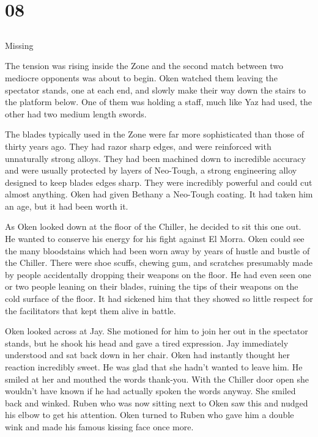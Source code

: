\chapter{08}
\section{}
Missing  

The tension was rising inside the Zone and the second match between two mediocre opponents was about to begin.  Oken watched them leaving the spectator stands, one at each end, and slowly make their way down the stairs to the platform below.  One of them was holding a staff, much like Yaz had used, the other had two medium length swords.

The blades typically used in the Zone were far more sophisticated than those of thirty years ago.  They had razor sharp edges, and were reinforced with unnaturally strong alloys.  They had been machined down to incredible accuracy and were usually protected by layers of Neo-Tough, a strong engineering alloy designed to keep blades edges sharp.  They were incredibly powerful and could cut almost anything.  Oken had given Bethany a Neo-Tough coating.  It had taken him an age, but it had been worth it.

As Oken looked down at the floor of the Chiller, he decided to sit this one out.  He wanted to conserve his energy for his fight against El Morra.  Oken could see the many bloodstains which had been worn away by years of hustle and bustle of the Chiller.  There were shoe scuffs, chewing gum, and scratches presumably made by people accidentally dropping their weapons on the floor.  He had even seen one or two people leaning on their blades, ruining the tips of their weapons on the cold surface of the floor.  It had sickened him that they showed so little respect for the facilitators that kept them alive in battle.  

Oken looked across at Jay.  She motioned for him to join her out in the spectator stands, but he shook his head and gave a tired expression.  Jay immediately understood and sat back down in her chair.  Oken had instantly thought her reaction incredibly sweet.  He was glad that she hadn't wanted to leave him.  He smiled at her and mouthed the words thank-you.  With the Chiller door open she wouldn't have known if he had actually spoken the words anyway.  She smiled back and winked.  Ruben who was now sitting next to Oken saw this and nudged his elbow to get his attention.  Oken turned to Ruben who gave him a double wink and made his famous kissing face once more.

